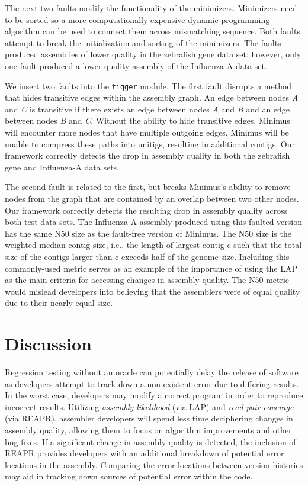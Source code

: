 The next two faults modify the functionality of the minimizers.
Minimizers need to be sorted so a more computationally expensive dynamic programming algorithm can be used to connect them across mismatching sequence.
Both faults attempt to break the initialization and sorting of the minimizers.
The faults produced assemblies of lower quality in the zebrafish gene data set; however, only one fault produced a lower quality assembly of the Influenza-A data set.

We insert two faults into the \texttt{tigger} module.
The first fault disrupts a method that hides transitive edges within the assembly graph.
An edge between nodes \emph{A} and \emph{C} is transitive if there exists an edge between nodes \emph{A} and \emph{B} and an edge between nodes \emph{B} and \emph{C}.
Without the ability to hide transitive edges, Minimus will encounter more nodes that have multiple outgoing edges.
Minimus will be unable to compress these paths into unitigs, resulting in additional contigs.
Our framework correctly detects the drop in assembly quality in both the zebrafish gene and Influenza-A data sets.

The second fault is related to the first, but breaks Minimus's ability to remove nodes from the graph that are contained by an overlap between two other nodes.
Our framework correctly detects the resulting drop in assembly quality across both test data sets.
The Influenza-A assembly produced using this faulted version has the same N50 size as the fault-free version of Minimus.
The N50 size is the weighted median
contig size, i.e., the length of largest contig c such that
the total size of the contigs larger than c exceeds half of
the genome size.
Including this commonly-used metric serves as an example of the importance of using the LAP as the main criteria for accessing changes in assembly quality.
The N50 metric would mislead developers into believing that the assemblers were of equal quality due to their nearly equal size.


\section{Discussion}
\label{discussion}

Regression testing without an oracle can potentially delay the release of software as developers attempt to track down a non-existent error due to differing results.
In the worst case, developers may modify a correct program in order to reproduce incorrect results.
Utilizing \emph{assembly likelihood} (via LAP) and \emph{read-pair coverage} (via REAPR), assembler developers will spend less time deciphering changes in assembly quality, allowing them to focus on algorithm improvements and other bug fixes.
If a significant change in assembly quality is detected, the inclusion of REAPR provides developers with an additional breakdown of potential error locations in the assembly.
Comparing the error locations between version histories may aid in tracking down sources of potential error within the code.

